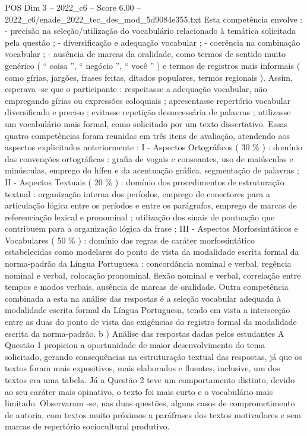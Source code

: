 \begin{textsample}{POS Dim 3 – 2022\_c6 – Score 6.00 – 2022\_c6/enade\_2022\_tec\_des\_mod\_5d9084e355.txt}
Esta competência envolve : - precisão na seleção/utilização do vocabulário relacionado à temática solicitada pela questão ; - diversificação e adequação vocabular ; - coerência na combinação vocabular ; - ausência de marcas da oralidade, como termos de sentido muito genérico ( “ coisa ”, “ negócio ”, “ você ” ) e termos de registros mais informais ( como gírias, jargões, frases feitas, ditados populares, termos regionais ).
Assim, esperava -se que o participante : respeitasse a adequação vocabular, não empregando gírias ou expressões coloquiais ; apresentasse repertório vocabular diversificado e preciso ; evitasse repetição desnecessária de palavras ; utilizasse um vocabulário mais formal, como solicitado por um texto dissertativo.
Essas quatro competências foram reunidas em três itens de avaliação, atendendo aos aspectos explicitados anteriormente : I - Aspectos Ortográficos ( 30 \% ) : domínio das convenções ortográficas : grafia de vogais e consoantes, uso de maiúsculas e minúsculas, emprego do hífen e da acentuação gráfica, segmentação de palavras ; II - Aspectos Textuais ( 20 \% ) : domínio dos procedimentos de estruturação textual : organização interna dos períodos, emprego de conectores para a articulação lógica entre os períodos e entre os parágrafos, emprego de marcas de referenciação lexical e pronominal ; utilização dos sinais de pontuação que contribuem para a organização lógica da frase ; III - Aspectos Morfossintáticos e Vocabulares ( 50 \% ) : domínio das regras de caráter morfossintático estabelecidas como modelares do ponto de vista da modalidade escrita formal da norma-padrão da Língua Portuguesa : concordância nominal e verbal, regência nominal e verbal, colocação pronominal, flexão nominal e verbal, correlação entre tempos e modos verbais, ausência de marcas de oralidade.
Outra competência combinada a esta na análise das respostas é a seleção vocabular adequada à modalidade escrita formal da Língua Portuguesa, tendo em vista a intersecção entre as duas do ponto de vista das exigências do registro formal da modalidade escrita da norma-padrão. b ) Análise das respostas dadas pelos estudantes A Questão 1 propiciou a oportunidade de maior desenvolvimento do tema solicitado, gerando consequências na estruturação textual das respostas, já que os textos foram mais expositivos, mais elaborados e fluentes, inclusive, um dos textos era uma tabela.
Já a Questão 2 teve um comportamento distinto, devido ao seu caráter mais opinativo, o texto foi mais curto e o vocabulário mais limitado.
Observaram -se, nas duas questões, alguns casos de comprometimento de autoria, com textos muito próximos a paráfrases dos textos motivadores e sem marcas de repertório sociocultural produtivo.

\end{textsample}

